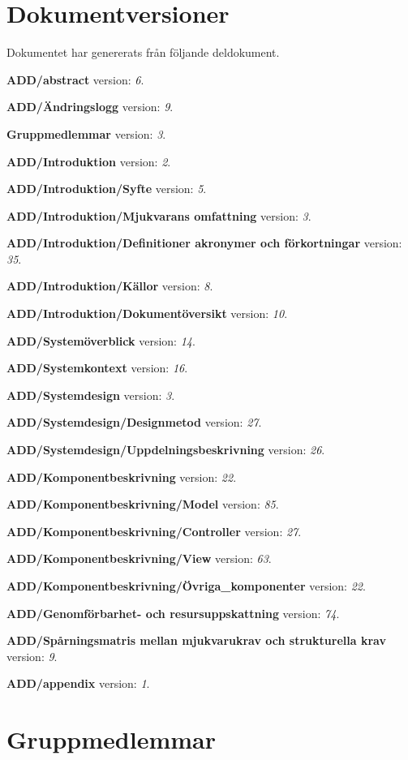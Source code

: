 \documentclass[a4paper, twoside, 11pt, titlepage]{article}
\begin{document}
\clearpage
\section*{Dokumentversioner}


Dokumentet har genererats från följande deldokument.

\textbf{ADD/abstract} version: \emph{6}.

\textbf{ADD/Ändringslogg} version: \emph{9}.

\textbf{Gruppmedlemmar} version: \emph{3}.

\textbf{ADD/Introduktion} version: \emph{2}.

\textbf{ADD/Introduktion/Syfte} version: \emph{5}.

\textbf{ADD/Introduktion/Mjukvarans omfattning} version: \emph{3}.

\textbf{ADD/Introduktion/Definitioner akronymer och förkortningar} version: \emph{35}.

\textbf{ADD/Introduktion/Källor} version: \emph{8}.

\textbf{ADD/Introduktion/Dokumentöversikt} version: \emph{10}.

\textbf{ADD/Systemöverblick} version: \emph{14}.

\textbf{ADD/Systemkontext} version: \emph{16}.

\textbf{ADD/Systemdesign} version: \emph{3}.

\textbf{ADD/Systemdesign/Designmetod} version: \emph{27}.

\textbf{ADD/Systemdesign/Uppdelningsbeskrivning} version: \emph{26}.

\textbf{ADD/Komponentbeskrivning} version: \emph{22}.

\textbf{ADD/Komponentbeskrivning/Model} version: \emph{85}.

\textbf{ADD/Komponentbeskrivning/Controller} version: \emph{27}.

\textbf{ADD/Komponentbeskrivning/View} version: \emph{63}.

\textbf{ADD/Komponentbeskrivning/Övriga\_komponenter} version: \emph{22}.

\textbf{ADD/Genomförbarhet- och resursuppskattning} version: \emph{74}.

\textbf{ADD/Spårningsmatris mellan mjukvarukrav och strukturella krav} version: \emph{9}.

\textbf{ADD/appendix} version: \emph{1}.

\clearpage
\section*{Gruppmedlemmar}
\end{document}
